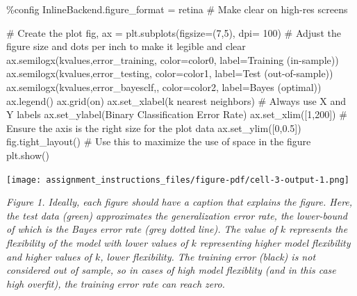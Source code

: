 \documentclass[
  letterpaper,
  DIV=11,
  numbers=noendperiod]{scrartcl}
\newenvironment{Shaded}{\begin{snugshade}}{\end{snugshade}}
\newcommand{\CommentTok}[1]{\textcolor[rgb]{0.37,0.37,0.37}{#1}}
\newcommand{\DecValTok}[1]{\textcolor[rgb]{0.68,0.00,0.00}{#1}}
\newcommand{\FloatTok}[1]{\textcolor[rgb]{0.68,0.00,0.00}{#1}}
\newcommand{\NormalTok}[1]{\textcolor[rgb]{0.00,0.23,0.31}{#1}}
\newcommand{\OperatorTok}[1]{\textcolor[rgb]{0.37,0.37,0.37}{#1}}
\newcommand{\StringTok}[1]{\textcolor[rgb]{0.13,0.47,0.30}{#1}}
\begin{document}
\begin{Shaded}
\begin{Highlighting}[]
\OperatorTok{\%}\NormalTok{config InlineBackend.figure\_format }\OperatorTok{=} \StringTok{\textquotesingle{}retina\textquotesingle{}} \CommentTok{\# Make clear on high{-}res screens}

\CommentTok{\# Create the plot}
\NormalTok{fig, ax }\OperatorTok{=}\NormalTok{ plt.subplots(figsize}\OperatorTok{=}\NormalTok{(}\DecValTok{7}\NormalTok{,}\DecValTok{5}\NormalTok{), dpi}\OperatorTok{=} \DecValTok{100}\NormalTok{) }\CommentTok{\# Adjust the figure size and dots per inch to make it legible and clear }
\NormalTok{ax.semilogx(kvalues,error\_training,}
\NormalTok{            color}\OperatorTok{=}\NormalTok{color0,}
\NormalTok{            label}\OperatorTok{=}\StringTok{\textquotesingle{}Training (in{-}sample)\textquotesingle{}}\NormalTok{)}
\NormalTok{ax.semilogx(kvalues,error\_testing,}
\NormalTok{            color}\OperatorTok{=}\NormalTok{color1,}
\NormalTok{            label}\OperatorTok{=}\StringTok{\textquotesingle{}Test (out{-}of{-}sample)\textquotesingle{}}\NormalTok{)}
\NormalTok{ax.semilogx(kvalues,error\_bayesclf,}\StringTok{\textquotesingle{}{-}{-}\textquotesingle{}}\NormalTok{,}
\NormalTok{            color}\OperatorTok{=}\NormalTok{color2,}
\NormalTok{            label}\OperatorTok{=}\StringTok{\textquotesingle{}Bayes (optimal)\textquotesingle{}}\NormalTok{)}
\NormalTok{ax.legend()}
\NormalTok{ax.grid(}\StringTok{\textquotesingle{}on\textquotesingle{}}\NormalTok{)}
\NormalTok{ax.set\_xlabel(}\StringTok{\textquotesingle{}k nearest neighbors\textquotesingle{}}\NormalTok{) }\CommentTok{\# Always use X and Y labels}
\NormalTok{ax.set\_ylabel(}\StringTok{\textquotesingle{}Binary Classification Error Rate\textquotesingle{}}\NormalTok{)}
\NormalTok{ax.set\_xlim([}\DecValTok{1}\NormalTok{,}\DecValTok{200}\NormalTok{]) }\CommentTok{\# Ensure the axis is the right size for the plot data}
\NormalTok{ax.set\_ylim([}\DecValTok{0}\NormalTok{,}\FloatTok{0.5}\NormalTok{])}
\NormalTok{fig.tight\_layout() }\CommentTok{\# Use this to maximize the use of space in the figure}
\NormalTok{plt.show()}
\end{Highlighting}
\end{Shaded}

\texttt{[image: assignment\_instructions\_files/figure-pdf/cell-3-output-1.png]}

\emph{Figure 1. Ideally, each figure should have a caption that explains
the figure. Here, the test data (green) approximates the generalization
error rate, the lower-bound of which is the Bayes error rate (grey
dotted line). The value of \(k\) represents the flexibility of the model
with lower values of \(k\) representing higher model flexibility and
higher values of \(k\), lower flexibility. The training error (black) is
not considered out of sample, so in cases of high model flexiblity (and
in this case high overfit), the training error rate can reach zero.}
\end{document}
